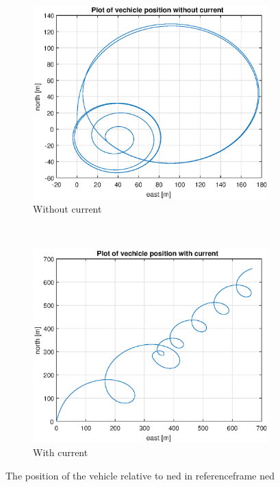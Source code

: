 \begin{figure}[!ht]
	\centering
	\begin{subfigure}[b]{0.45\textwidth}
		\includegraphics[width=\textwidth]{figures/2_6_pos}
		\caption{Without current}
	\end{subfigure}
	~ %
	\begin{subfigure}[b]{0.45\textwidth}
		\includegraphics[width=\textwidth]{figures/2_6_pos_cur}
		\caption{With current}
	\end{subfigure}
	\caption{The position of the vehicle relative to ned  in referenceframe ned}
	\label{fig:2_6_pos}
\end{figure}

